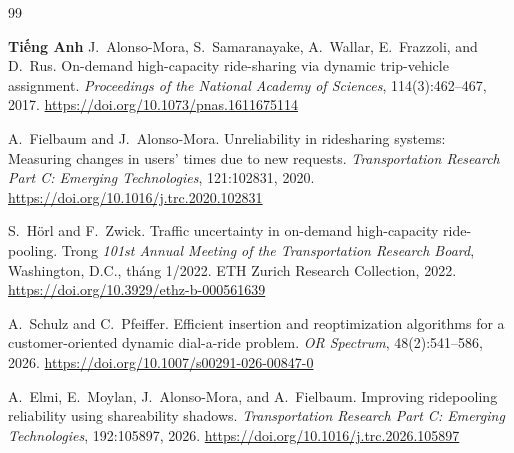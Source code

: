 \renewcommand{\bibname}{Tài liệu tham khảo}
\begin{thebibliography}{99}
\addcontentsline{toc}{chapter}{\bibname}
\setlength{\itemsep}{5pt}

\item[]\textbf{Tiếng Anh}
J.~Alonso-Mora, S.~Samaranayake, A.~Wallar, E.~Frazzoli, and D.~Rus.
\newblock On-demand high-capacity ride-sharing via dynamic trip-vehicle assignment.
\newblock \emph{Proceedings of the National Academy of Sciences}, 114(3):462--467, 2017.
\newblock \url{https://doi.org/10.1073/pnas.1611675114}

A.~Fielbaum and J.~Alonso-Mora.
\newblock Unreliability in ridesharing systems: Measuring changes in users' times due to new requests.
\newblock \emph{Transportation Research Part C: Emerging Technologies}, 121:102831, 2020.
\newblock \url{https://doi.org/10.1016/j.trc.2020.102831}

S.~Hörl and F.~Zwick.
\newblock Traffic uncertainty in on-demand high-capacity ride-pooling.
\newblock Trong \emph{101st Annual Meeting of the Transportation Research Board}, Washington, D.C., tháng 1/2022. ETH Zurich Research Collection, 2022.
\newblock \url{https://doi.org/10.3929/ethz-b-000561639}

A.~Schulz and C.~Pfeiffer.
\newblock Efficient insertion and reoptimization algorithms for a customer-oriented dynamic dial-a-ride problem.
\newblock \emph{OR Spectrum}, 48(2):541--586, 2026.
\newblock \url{https://doi.org/10.1007/s00291-026-00847-0}

A.~Elmi, E.~Moylan, J.~Alonso-Mora, and A.~Fielbaum.
\newblock Improving ridepooling reliability using shareability shadows.
\newblock \emph{Transportation Research Part C: Emerging Technologies}, 192:105897, 2026.
\newblock \url{https://doi.org/10.1016/j.trc.2026.105897}


\end{thebibliography}
